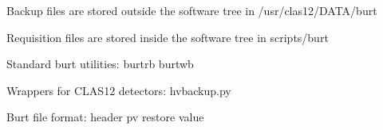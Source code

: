
Backup files are stored outside the software tree in
/usr/clas12/DATA/burt

Requisition files are stored inside the software tree in
scripts/burt

Standard burt utilities:
burtrb
burtwb

Wrappers for CLAS12 detectors:
hvbackup.py

Burt file format:
header
pv restore value

